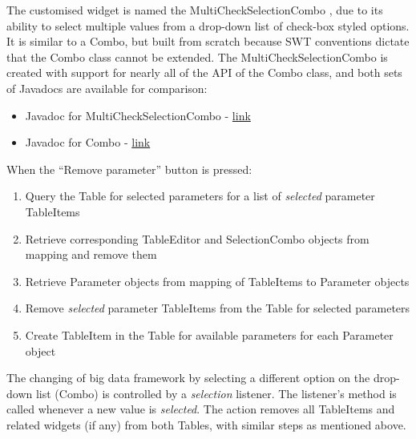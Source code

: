 The customised widget is named the MultiCheckSelectionCombo \cite{mcsc}, due to its ability to select multiple values from a drop-down list of check-box styled options. It is similar to a Combo, but built from scratch because SWT conventions dictate that the Combo class cannot be extended. The MultiCheckSelectionCombo is created with support for nearly all of the API of the Combo class, and both sets of Javadocs are available for comparison:
\begin{itemize}
\item Javadoc for MultiCheckSelectionCombo - \href{https://lawhcd.github.io/SWTMultiCheckSelectionCombo/}{link} \cite{javadoc}
\item Javadoc for Combo - \href{http://help.eclipse.org/kepler/index.jsp?topic=\%2Forg.eclipse.platform.doc.isv\%2Freference\%2Fapi\%2Forg\%2Feclipse\%2Fswt\%2Fwidgets\%2FCombo.html}{link} \cite{combo}
\end{itemize}
When the ``Remove parameter'' button is pressed:
\begin{enumerate}
\item Query the Table for selected parameters for a list of \textit{selected} parameter TableItems
\item Retrieve corresponding TableEditor and SelectionCombo objects from mapping and remove them
\item Retrieve Parameter objects from mapping of TableItems to Parameter objects
\item Remove \textit{selected} parameter TableItems from the Table for selected parameters
\item Create TableItem in the Table for available parameters for each Parameter object
\end{enumerate}
The changing of big data framework by selecting a different option on the drop-down list (Combo) is controlled by a \textit{selection} listener. The listener's method is called whenever a new value is \textit{selected}. The action removes all TableItems and related widgets (if any) from both Tables, with similar steps as mentioned above.

\newpage
